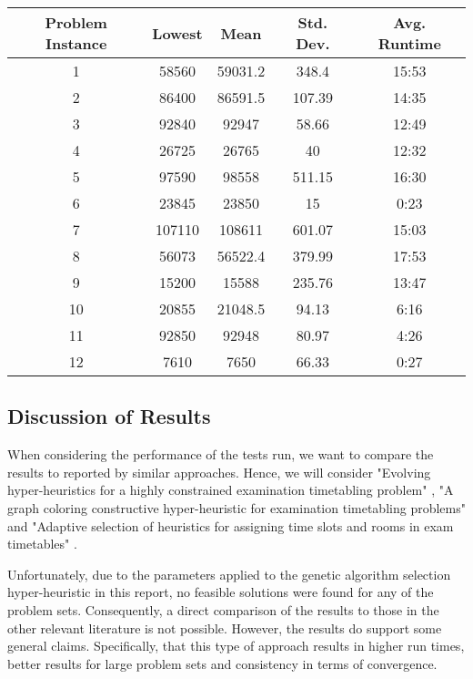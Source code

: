 \documentclass[conference]{IEEEtran}
\begin{document}
\begin{table}[h!]
\begin{tabular}{|c|c|c|c|c|}
\hline
Problem Instance & Lowest & Mean    & Std. Dev. & Avg. Runtime \\ \hline
1                & 58560  & 59031.2 & 348.4     & 15:53        \\ \hline
2                & 86400  & 86591.5 & 107.39    & 14:35        \\ \hline
3                & 92840  & 92947   & 58.66     & 12:49        \\ \hline
4                & 26725  & 26765   & 40        & 12:32        \\ \hline
5                & 97590  & 98558   & 511.15    & 16:30        \\ \hline
6                & 23845  & 23850   & 15        & 0:23         \\ \hline
7                & 107110 & 108611  & 601.07    & 15:03        \\ \hline
8                & 56073  & 56522.4 & 379.99    & 17:53        \\ \hline
9                & 15200  & 15588   & 235.76    & 13:47        \\ \hline
10               & 20855  & 21048.5 & 94.13     & 6:16         \\ \hline
11               & 92850  & 92948   & 80.97     & 4:26         \\ \hline
12               & 7610   & 7650    & 66.33     & 0:27         \\ \hline
\end{tabular}
\end{table}

\subsection{Discussion of Results}

When considering the performance of the tests run, we want to compare the results to reported by similar approaches. Hence, we will consider "Evolving hyper-heuristics for a highly constrained examination timetabling problem" \cite{pillay2010evolving}, "A graph coloring constructive hyper-heuristic for examination timetabling problems" \cite{sabar2012graph} and "Adaptive selection of heuristics for assigning time slots and rooms in exam timetables" \cite{soghier2013adaptive}.

Unfortunately, due to the parameters applied to the genetic algorithm selection hyper-heuristic in this report, no feasible solutions were found for any of the problem sets. Consequently, a direct comparison of the results to those in the other relevant literature is not possible. However, the results do support some general claims. Specifically, that this type of approach results in higher run times, better results for large problem sets and consistency in terms of convergence.
\end{document}
